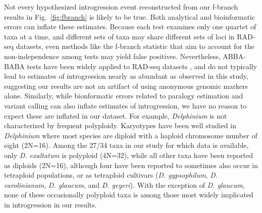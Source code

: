 \documentclass[11pt]{article}
\begin{document}
Not every hypothesized introgression event reconstructed from our f-branch results 
in Fig.~\ref{fig:fbranch} is likely to be true. Both analytical and bioinformatic
errors can inflate these estimates. Because each test examines only one quartet of taxa at a time, and different sets of taxa may share different sets of loci in RAD-seq datasets, even methods like the f-branch statistic that aim to account for the non-independence among tests may yield false positives. Nevertheless, ABBA-BABA tests have been widely applied to RAD-seq datasets \citep{heliconius_genome_consortium_butterfly_2012, eaton_inferring_2013, eaton_historical_2015, mccluskey_phylogeny_2015, vargas_conflicting_2017},
and do not typically lead to estimates of introgression nearly as abundant as observed in this study, suggesting our results are not an artifact of using anonymous genomic markers alone.
% 
Similarly, while bionformatic errors related to paralogy estimation and variant calling
can also inflate estimates of introgression, we have no reason to expect these
are inflated in our dataset. 
For example, \emph{Delphinium} is not characterized by frequent polyploidy.
% 
Karyotypes have been well studied in \emph{Delphinium} \citep{turner_cytogenetics_1992, legro_species_1961, lewis-chromosome}
where most species are diploid with a haploid chromosome number of eight (2N=16).
Among the 27/34 taxa in our study for which data is available, only \emph{D. exaltatum} is polyploid (4N=32), while all other taxa have been reported as diploids (2N=16), although four have been reported to sometimes also occur in tetraploid populations, or as tetraploid cultivars (\emph{D. gypsophilum}, \emph{D. carolinianum}, \emph{D. glaucum}, and \emph{D. geyeri}). With the exception of \emph{D. glaucum}, none of these occasionally polyploid taxa is among those most widely implicated in introgression in our results.
\end{document}
